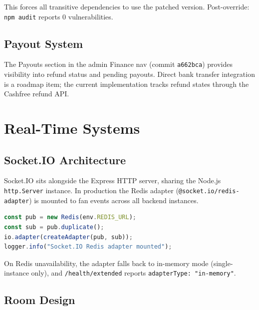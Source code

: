 \documentclass[11pt,a4paper,twoside]{book}
\begin{document}
This forces all transitive dependencies to use the patched version. Post-override:
\texttt{npm audit} reports 0 vulnerabilities.

\section{Payout System}

The Payouts section in the admin Finance nav (commit \texttt{a662bca}) provides
visibility into refund status and pending payouts.  Direct bank transfer
integration is a roadmap item; the current implementation tracks refund states
through the Cashfree refund API.

\chapter{Real-Time Systems}

\section{Socket.IO Architecture}

Socket.IO sits alongside the Express HTTP server, sharing the Node.js \texttt{http.Server}
instance.  In production the Redis adapter (\texttt{@socket.io/redis-adapter})
is mounted to fan events across all backend instances.

\begin{lstlisting}[language=JavaScript,caption={Redis adapter initialization (socketServer.js)}]
const pub = new Redis(env.REDIS_URL);
const sub = pub.duplicate();
io.adapter(createAdapter(pub, sub));
logger.info("Socket.IO Redis adapter mounted");
\end{lstlisting}

On Redis unavailability, the adapter falls back to in-memory mode (single-instance
only), and \texttt{/health/extended} reports \texttt{adapterType: "in-memory"}.

\section{Room Design}
\end{document}
